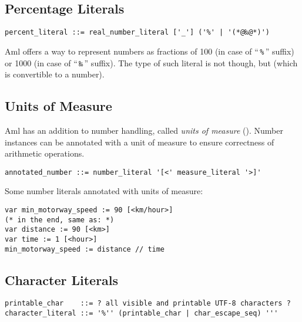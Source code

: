 \subsection{Percentage Literals}
\label{sec:percentageliterals}

\syntax\begin{lstlisting}
percent_literal ::= real_number_literal ['_'] ('%' | '(*@‰@*)')
\end{lstlisting}

Aml offers a way to represent numbers as fractions of 100 (in case of ``\,\lstinline!%!\,'' suffix) or 1000 (in case of ``\,\texttt{‰}\,'' suffix). The type of such literal is not  though, but  (which is convertible to a number). 





\subsection{Units of Measure}
\label{sec:unitsofmeasuresyntax}

Aml has an addition to number handling, called {\em units of measure} (). Number instances can be annotated with a unit of measure to ensure correctness of arithmetic operations. 

\syntax\begin{lstlisting}
annotated_number ::= number_literal '[<' measure_literal '>]'
\end{lstlisting}

\example Some number literals annotated with units of measure:
\begin{lstlisting}
var min_motorway_speed := 90 [<km/hour>]
(* in the end, same as: *)
var distance := 90 [<km>]
var time := 1 [<hour>]
min_motorway_speed := distance // time
\end{lstlisting}






\subsection{Character Literals}
\label{sec:characterliterals}

\syntax\begin{lstlisting}[deletekeywords={and}]
printable_char    ::= ? all visible and printable UTF-8 characters ? 
character_literal ::= '%'' (printable_char | char_escape_seq) '''
\end{lstlisting}

